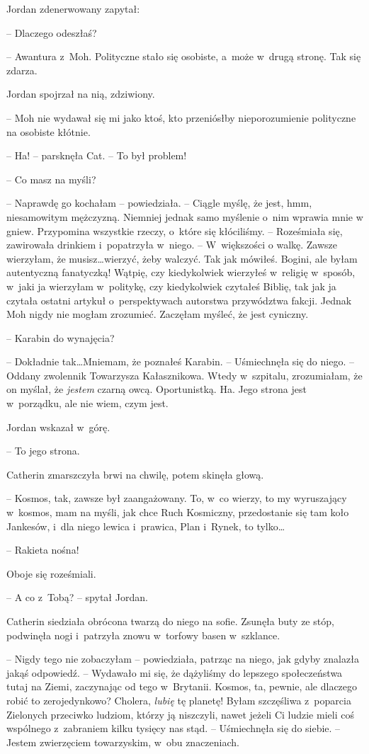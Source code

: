 \documentclass[oneside,polish,11pt,sfheadings]{mwbk}
\begin{document}
Jordan zdenerwowany zapytał: 

-- Dlaczego odeszłaś?

-- Awantura z~Moh. Polityczne stało się osobiste, a~może w~drugą stronę.
Tak się zdarza.

Jordan spojrzał na nią, zdziwiony. 

-- Moh nie wydawał się mi jako ktoś,
kto przeniósłby nieporozumienie polityczne na osobiste kłótnie.

-- Ha! -- parsknęła Cat. -- To był problem!

-- Co masz na myśli?

-- Naprawdę go kochałam -- powiedziała. -- Ciągle myślę, że jest, hmm,
niesamowitym mężczyzną. Niemniej jednak samo myślenie o~nim wprawia mnie
w gniew. Przypomina wszystkie rzeczy, o~które się kłóciliśmy. -- Roześmiała się, zawirowała drinkiem i~popatrzyła w~niego. -- W~większości
o walkę. Zawsze wierzyłam, że musisz\ldots wierzyć, żeby walczyć. Tak jak
mówiłeś. Bogini, ale byłam autentyczną fanatyczką! Wątpię, czy
kiedykolwiek wierzyłeś w~religię w~sposób, w~jaki ja wierzyłam w~politykę, czy kiedykolwiek czytałeś Biblię, tak jak ja czytała ostatni
artykuł o~perspektywach autorstwa przywództwa fakcji. Jednak Moh nigdy
nie mogłam zrozumieć. Zaczęłam myśleć, że jest cyniczny.

-- Karabin do wynajęcia?

-- Dokładnie tak\ldots Mniemam, że poznałeś Karabin. -- Uśmiechnęła się do
niego. -- Oddany zwolennik Towarzysza Kałasznikowa. Wtedy w~szpitalu,
zrozumiałam, że on myślał, że \emph{jestem }czarną owcą. Oportunistką.
Ha. Jego strona jest w~porządku, ale nie wiem, czym jest.

Jordan wskazał w~górę. 

-- To jego strona.

Catherin zmarszczyła brwi na chwilę, potem skinęła głową.

-- Kosmos, tak, zawsze był zaangażowany. To, w~co wierzy, to my
wyruszający w~kosmos, mam na myśli, jak chce Ruch Kosmiczny,
przedostanie się tam koło Jankesów, i~dla niego lewica i~prawica, Plan i~Rynek, to tylko\ldots

-- Rakieta nośna!

Oboje się roześmiali.

-- A co z~Tobą? -- spytał Jordan.

Catherin siedziała obrócona twarzą do niego na sofie. Zsunęła buty ze
stóp, podwinęła nogi i~patrzyła znowu w~torfowy basen w~szklance.

-- Nigdy tego nie zobaczyłam -- powiedziała, patrząc na niego, jak gdyby
znalazła jakąś odpowiedź. -- Wydawało mi się, że dążyliśmy do lepszego
społeczeństwa tutaj na Ziemi, zaczynając od tego w~Brytanii. Kosmos, ta,
pewnie, ale dlaczego robić to zerojedynkowo? Cholera, \emph{lubię} tę
planetę! Byłam szczęśliwa z~poparcia Zielonych przeciwko ludziom, którzy
ją niszczyli, nawet jeżeli Ci ludzie mieli coś wspólnego z~zabraniem
kilku tysięcy nas stąd. -- Uśmiechnęła się do siebie. -- Jestem
zwierzęciem towarzyskim, w~obu znaczeniach.
\end{document}
